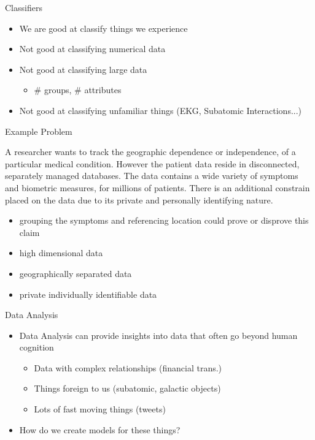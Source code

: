 \documentclass[12pt]{beamer}
\begin{document}
\begin{frame}[plain]{Classifiers}
    
\begin{itemize}
 \item We are good at classify things we experience
 \item Not good at classifying numerical data
 \item Not good at classifying large data
 \begin{itemize}
  \item  $\#$ groups,  $\#$ attributes
 \end{itemize}
\item Not good at classifying unfamiliar things (EKG, Subatomic Interactions...)
\end{itemize}
\end{frame}

\begin{frame}[plain]{Example Problem}

 A researcher wants to track the geographic dependence or independence, of a particular medical condition.
 However the patient data reside in disconnected, separately managed databases. The data contains a wide variety
 of symptoms and biometric measures, for millions of patients. There is an additional constrain placed on the data 
 due to its private and personally identifying nature. 
 \begin{itemize}
  \item grouping the symptoms and referencing location could prove or disprove this claim
  \item high dimensional data
  \item geographically separated data
  \item private individually identifiable data
 \end{itemize}
\end{frame}

\begin{frame}[plain]{Data Analysis}
  \begin{itemize}
    \item Data Analysis can provide insights into data that often go beyond human cognition
  \begin{itemize}
    \item Data with complex relationships (financial trans.)
    \item Things foreign to us (subatomic, galactic objects)
    \item Lots of fast moving things (tweets)
  \end{itemize}
    \item How do we create models for these things?
  \end{itemize}
\end{frame}
\end{document}
